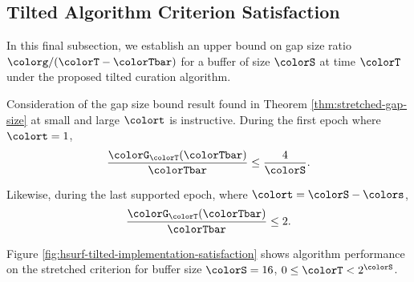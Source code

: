 \subsection{Tilted Algorithm Criterion Satisfaction}
\label{sec:tilted-satisfaction}

In this final subsection, we establish an upper bound on gap size ratio $\colorg/(\colorT - \colorTbar)$ for a buffer of size $\colorS$ at time $\colorT$ under the proposed tilted curation algorithm.



Consideration of the gap size bound result found in Theorem \ref{thm:stretched-gap-size} at small and large $\colort$ is instructive.
During the first epoch where $\colort = 1$,
\begin{align*}
\frac{\colorG_{\colorT}(\colorTbar)}{\colorTbar}
\leq
\frac{4}{\colorS}.
\end{align*}

Likewise, during the last supported epoch, where $\colort = \colorS - \colors$,
\begin{align*}
\frac{\colorG_{\colorT}(\colorTbar)}{\colorTbar}
\leq
2.
\end{align*}

Figure \ref{fig:hsurf-tilted-implementation-satisfaction} shows algorithm performance on the stretched criterion for buffer size $\colorS=16$, $0 \leq \colorT < 2^{\colorS}$.
